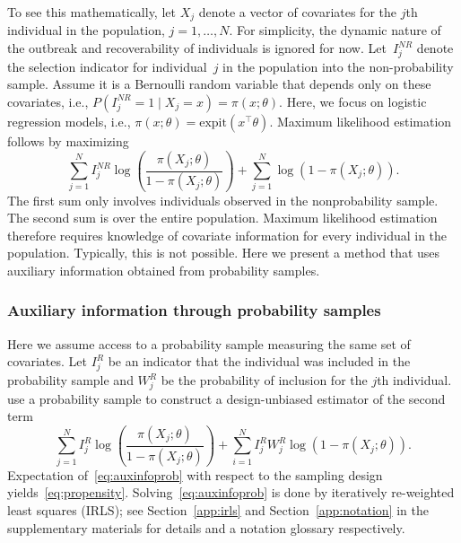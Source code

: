 \documentclass[11pt]{amsart}
\numberwithin{equation}{section}
\theoremstyle{plain}
\begin{document}
 To see this mathematically, let $X_j$ denote a vector of covariates for the $j$th individual in the population, $j=1,\ldots,N$.  For simplicity, the dynamic nature of the outbreak and recoverability of individuals is ignored for now. Let~$I_j^{NR}$ denote the selection indicator for individual~$j$ in the population into the non-probability sample.  Assume it is a Bernoulli random variable that depends only on these covariates, i.e., $P(I^{NR}_j = 1 \mid X_j = x) = \pi (x; \theta)$. Here, we focus on logistic regression models, i.e., $\pi(x; \theta) = \text{expit} \left( x^\top \theta \right)$. Maximum likelihood estimation follows by maximizing
 \begin{equation}
 \label{eq:propensity}
 \sum_{j=1}^N I_j^{NR} \log \left( \frac{\pi (X_j; \theta)}{1-\pi(X_j; \theta)} \right) + \sum_{j=1}^N \log \left( 1 - \pi (X_j; \theta) \right).
 \end{equation}
 The first sum only involves individuals observed in the nonprobability sample.
 The second sum is over the entire population.  Maximum likelihood estimation therefore requires knowledge of covariate information for every individual in the population.  Typically, this is not possible.  Here we present a method that uses auxiliary information obtained from probability samples.

 \subsubsection{Auxiliary information through probability samples}
 \label{subsec:auxprob}

 Here we assume access to a probability sample measuring the same set of covariates.  Let $I_j^{R}$ be an indicator that the individual was included in the probability sample and $W_j^R$ be the probability of inclusion for the $j$th individual. \cite{Chen2019} use a probability sample to construct a design-unbiased estimator of the second term
 \begin{equation}
 \label{eq:auxinfoprob}
 \sum_{j=1}^N I_j^R \log \left( \frac{\pi (X_j; \theta)}{1-\pi(X_j; \theta)} \right)  + \sum_{i=1}^N I_j^R W_j^R \log ( 1 - \pi (X_j; \theta)).
 \end{equation}
 Expectation of~\ref{eq:auxinfoprob} with respect to the sampling design yields~\eqref{eq:propensity}. Solving~\eqref{eq:auxinfoprob} is done by iteratively re-weighted least squares (IRLS); see Section~\ref{app:irls} and Section~\ref{app:notation} in the supplementary materials for details and a notation glossary respectively.
\end{document}
